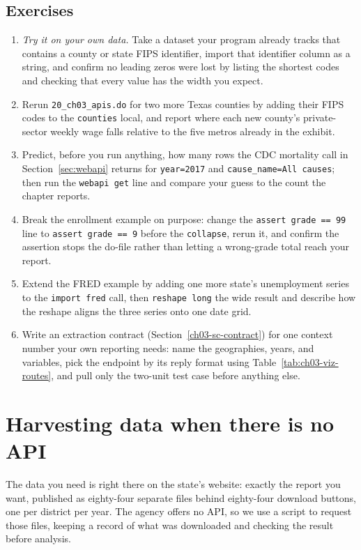 \documentclass[
    a4paper,
    fontsize=10pt,
    twoside=true,
    numbers=noenddot,
]{kaobook}
\begin{document}
\section*{Exercises}
\begin{enumerate}
  \item \emph{Try it on your own data.} Take a dataset your program already tracks that contains a county or state FIPS identifier, import that identifier column as a string, and confirm no leading zeros were lost by listing the shortest codes and checking that every value has the width you expect.
  \item Rerun \texttt{20\_ch03\_apis.do} for two more Texas counties by adding their FIPS codes to the \texttt{counties} local, and report where each new county's private-sector weekly wage falls relative to the five metros already in the exhibit.
  \item Predict, before you run anything, how many rows the CDC mortality call in Section~\ref{sec:webapi} returns for \texttt{year=2017} and \texttt{cause\_name=All causes}; then run the \texttt{webapi get} line and compare your guess to the count the chapter reports.
  \item Break the enrollment example on purpose: change the \texttt{assert grade == 99} line to \texttt{assert grade == 9} before the \texttt{collapse}, rerun it, and confirm the assertion stops the do-file rather than letting a wrong-grade total reach your report.
  \item Extend the FRED example by adding one more state's unemployment series to the \texttt{import fred} call, then \texttt{reshape long} the wide result and describe how the reshape aligns the three series onto one date grid.
  \item Write an extraction contract (Section~\ref{ch03-sc-contract}) for one context number your own reporting needs: name the geographies, years, and variables, pick the endpoint by its reply format using Table~\ref{tab:ch03-viz-routes}, and pull only the two-unit test case before anything else.
\end{enumerate}

\chapter{Harvesting data when there is no API}\label{ch:noapi}

The data you need is right there on the state's website: exactly the report you want, published as eighty-four separate files behind eighty-four download buttons, one per district per year. The agency offers no API, so we use a script to request those files, keeping a record of what was downloaded and checking the result before analysis.
\end{document}
